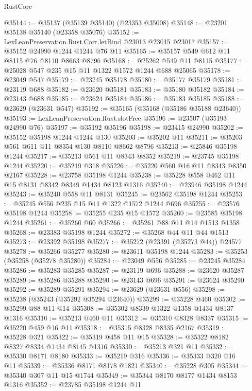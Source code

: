 \begin{lexlean}{RustCore}
\begin{coremodule}
@35144 := @35137 (@35139 @35140) (@23353 @35008)
@35148 := @23201 @35138 @35140 (@23358 @35076)
@35152 := LexLeanPreservation.Rust.Corr.letBind @23013 @23015 @23017
@35157 := @35152 @24990 @1244 @1244 @76 @11
@35165 := @35157 @549 @612 @11 @8115 @76 @8110 @8663 @8796
@35168 := @25262 @549 @11 @8115
@35177 := @25028 @547 @235 @15 @11 @1322 @1572 @1244 @688 @25065
@35178 := @23049 @547
@35179 := @23245 @35178
@35180 := @35177 @35179
@35181 := @23119 @688
@35182 := @23620 @35181
@35183 := @35180 @35182
@35184 := @23143 @688
@35185 := @23624 @35184
@35186 := @35183 @35185
@35188 := @23629 (@23631 @547)
@35192 := @35165 (@35168 (@35186 @35188 @23640))
@35193 := LexLeanPreservation.Rust.slotFree
@35196 := @23507 (@35193 @24990 @76)
@35197 := @35192 @35196
@35198 := @23415 @24990
@35202 := @35152 @35198 @1244 @1244 @130
@35203 := @35202 @11
@35211 := @35203 @561 @611 @11 @8354 @130 @8110 @8662 @8796
@35213 := @25846 @35198 @1244
@35217 := @35213 @561 @11 @8343 @8352
@35219 := @23745 @35198 @1244
@35220 := @35219 @318
@35226 := @35220 @560 @16 @11 @8343 @8350 @2167
@35228 := @23758 @35198 @1244
@35238 := @35228 @558 @462 @11 @15 @8131 @8342 @8349 @1434 @8123 @1316
@35240 := @23946 @35198 @1244
@35243 := @35240 @558 @11 @8131
@35245 := @23562 @35198 @1244
@35253 := @35245 @556 @235 @15 @11 @1322 @1572 @1244 @696
@35255 := @23576 @35198 @1244
@35258 := @35255 @235 @15 @1572
@35260 := @23585 @35198 @1244
@35261 := @35260 @60
@35266 := @35261 @88 @11 @14 @1513 @1358
@35268 := @23383 @35198 @1244
@35272 := @35268 @44 @11 @44 @1513
@35273 := @23392 @35198
@35277 := @35272 (@23391 (@35273 @44)) @24577
@35278 := @35266 @35277
@35280 := @23611 @35198 @1244
@35283 := @35253 (@35258 (@35278 @35280))
@35284 := @23049 @556
@35285 := @23245 @35284
@35286 := @35283 @35285
@35287 := @23119 @696
@35288 := @23620 @35287
@35289 := @35286 @35288
@35290 := @23143 @696
@35291 := @23624 @35290
@35292 := @35289 @35291
@35294 := @23629 (@23631 @556)
@35298 := @35238 (@35243 (@35292 @35294 @23640))
@35299 := @35228 @460
@35302 := @35299 @88 @11 @14
@35308 := @35302 @8339 @1322 @1358 @1434 @8137 @1316
@35310 := @35213 @460 @11
@35312 := @35310 @8328 @8337
@35315 := @35220 @459 @16 @11
@35318 := @35315 @8328 @8335 @2167
@35319 := @35228 @321
@35322 := @35319 @458 @11 @15
@35328 := @35322 @8182 @8327 @8334 @1434 @8145 @1316
@35330 := @35213 @321 @11
@35332 := @35330 @8171 @8180
@35333 := @35219 @316
@35336 := @35333 @320 @16 @11
@35339 := @35336 @8171 @8178 @1821
@35340 := @35228 @305
@35344 := @35340 @307 @11 @15 @1744
@35349 := @35344 @8170 @8177 @1434 @8153 @1316
@35352 := @23785 @35198 @1244 @11

\end{coremodule}
\end{lexlean}
